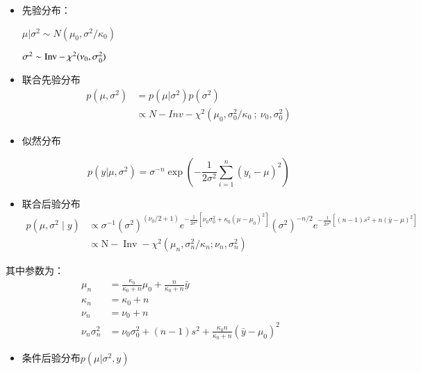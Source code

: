 \begin{itemize}
\item 先验分布：

  \(\mu|\sigma^2 \sim N(\mu_0,\sigma^2/\kappa_0)\)

  \(\sigma^2 \sim \rm Inv-\chi^2(\nu_0,\sigma^2_0)\)

\item 联合先验分布
  \begin{align*}
  p(\mu,\sigma^2)
  &=p(\mu|\sigma^2)p(\sigma^2)\\
  &\propto N-Inv-\chi^2(\mu_0,\sigma^2_0/\kappa_0\ ;\ \nu_0,\sigma^2_0 )
  \end{align*}

\item 似然分布

  \[p(y|\mu,\sigma^2)=\sigma^{-n}\exp \left(
  -\frac{1}{2\sigma^2}\sum_{i=1}^{n}(y_i-\mu)^2
  \right)\]

\item 联合后验分布
\begin{equation}
  \begin{aligned}
    p\left(\mu, \sigma^{2} \mid y\right) 
    & \propto \sigma^{-1}\left(\sigma^{2}\right)^{\left(\nu_{0} / 2+1\right)} e^{-\frac{1}{2 \sigma^{2}}\left[\nu_{0} \sigma_{0}^{2}+\kappa_{0}\left(\mu-\mu_{0}\right)^{2}\right]}
    \left(\sigma^{2}\right)^{-n / 2} e^{-\frac{1}{2 \sigma^{2}}\left[(n-1) s^{2}+n(\bar{y}-\mu)^{2}\right]} \\
    & \propto \mathrm{N}-\operatorname{Inv}-\chi^{2}\left(\mu_{n}, \sigma_{n}^{2} / \kappa_{n} ; \nu_{n}, \sigma_{n}^{2}\right)
  \end{aligned}
\end{equation}

\end{itemize}

其中参数为：
\begin{subequations}
  \begin{align}
    \mu_{n}   &= \frac{\kappa_{0}}{\kappa_{0}+n} \mu_{0}+\frac{n}{\kappa_{0}+n} \bar{y}\\
    \kappa_{n} &= \kappa_{0}+n \\
    \nu_{n}   &= \nu_{0}+n \\
    \nu_{n} \sigma_{n}^{2}&=\nu_{0} \sigma_{0}^{2}+(n-1) s^{2}+\frac{\kappa_{0} n}{\kappa_{0}+n}\left(\bar{y}-\mu_{0}\right)^{2}
    \end{align}
\end{subequations}

\begin{itemize}
\item
  条件后验分布\(p(\mu|\sigma^2,y)\)
\end{itemize}

